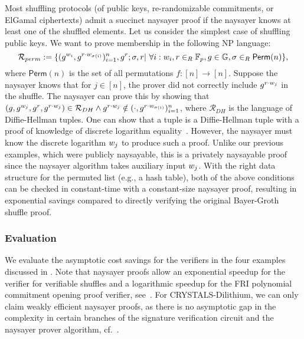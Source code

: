 Most shuffling protocols (of public keys, re-randomizable commitments, or ElGamal ciphertexts) admit a succinct naysayer proof if the naysayer knows at least one of the shuffled elements. Let us consider the simplest case of shuffling public keys. We want to prove membership in the following  NP language:
\begin{equation}\label{eq:permlanguage}
    \mathcal{R}_{perm}:=\{(g^{w_i},g^{r\cdot w_{\sigma(i)}})^{n}_{i=1},g^r;\sigma,r\vert\ \forall i:w_i,r\in_{R}\mathbb{F}_p,g\in\mathbb{G},  \sigma\in_{R}\mathsf{Perm}(n)\}, 
\end{equation}
where $\mathsf{Perm}(n)$ is the set of all permutations $f:[n]\rightarrow[n]$.
Suppose the naysayer knows that for $j\in[n]$, the prover did not correctly include $g^{r\cdot w_j}$ in the shuffle. The naysayer can prove this by showing that $(g,g^{w_j},g^r,g^{r\cdot w_j})\in\mathcal{R}_{DH}\land g^{r\cdot w_j}\notin (\cdot,g^{r\cdot w_{\sigma(i)}})^n_{i=1}$, where $\mathcal{R}_{DH}$ is the language of Diffie-Hellman tuples. One can show that a tuple is a Diffie-Hellman tuple with a proof of knowledge of discrete logarithm equality~\cite{C:ChaPed92}. However, the naysayer must know the discrete logarithm $w_j$ to produce such a proof. Unlike our previous examples, which were publicly naysayable, this is a privately naysayable proof since the naysayer algorithm takes auxiliary input $w_j$. With the right data structure for the permuted list (e.g., a hash table), both of the above conditions can be checked in constant-time with a constant-size naysayer proof, resulting in exponential savings compared to directly verifying the original Bayer-Groth shuffle proof.

\subsubsection{Evaluation}
We evaluate the asymptotic cost savings for the verifiers in the four examples discussed in . Note that naysayer proofs allow an exponential speedup for the verifier for verifiable shuffles and a logarithmic speedup for the FRI polynomial commitment opening proof verifier, see~. For CRYSTALS-Dilithium, we can only claim weakly efficient naysayer proofs, as there is no asymptotic gap in the complexity in certain branches of the signature verification circuit and the naysayer prover algorithm, cf.~.



